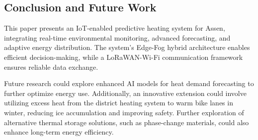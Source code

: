 \documentclass[conference]{IEEEtran}
\begin{document}
\subsection{Conclusion and Future Work}

This paper presents an IoT-enabled predictive heating system for Assen, integrating real-time environmental monitoring, advanced forecasting, and adaptive energy distribution. The system’s Edge-Fog hybrid architecture enables efficient decision-making, while a LoRaWAN-Wi-Fi communication framework ensures reliable data exchange.

Future research could explore enhanced AI models for heat demand forecasting to further optimize energy use. Additionally, an innovative extension could involve utilizing excess heat from the district heating system to warm bike lanes in winter, reducing ice accumulation and improving safety. Further exploration of alternative thermal storage solutions, such as phase-change materials, could also enhance long-term energy efficiency.



\end{document}
